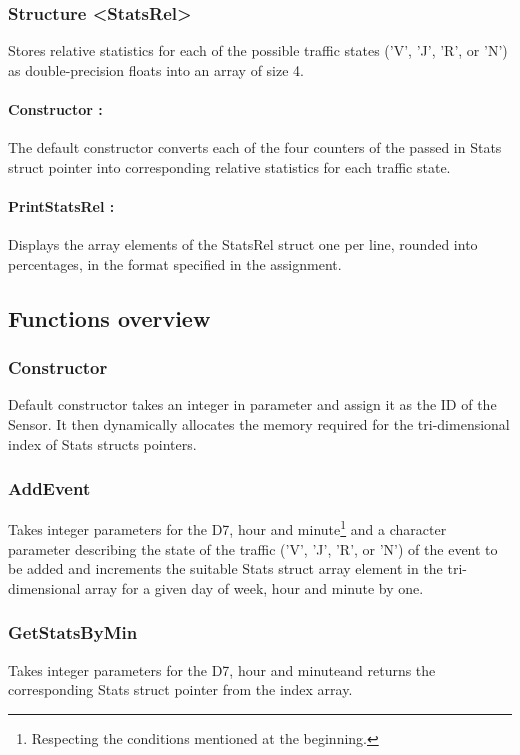 \documentclass[10pt]{article}
\begin{document}
\subsubsection{Structure <StatsRel>}
Stores relative statistics for each of the possible traffic states ('V', 'J', 'R', or 'N') as double-precision floats into an array of size 4.

\paragraph{Constructor :}
The default constructor converts each of the four counters of the passed in Stats struct pointer into corresponding relative statistics for each traffic state.

\paragraph{PrintStatsRel :}
Displays the array elements of the StatsRel struct one per line, rounded into percentages, in the format specified in the assignment.

\subsection{Functions overview}

\subsubsection*{Constructor}
Default constructor takes an integer in parameter and assign it as the ID of the Sensor. It then dynamically allocates the memory required for the tri-dimensional index of Stats structs pointers.

\subsubsection*{AddEvent}
Takes integer parameters for the D7, hour and minute\footnote{ Respecting the conditions mentioned at the beginning.} and a character parameter describing the state of the traffic ('V', 'J', 'R', or 'N') of the event to be added and increments the suitable Stats struct array element in the tri-dimensional array for a given day of week, hour and minute by one.

\subsubsection*{GetStatsByMin}
Takes integer parameters for the D7, hour and minute\footnotemark[1] and returns the corresponding Stats struct pointer from the index array.
\end{document}
